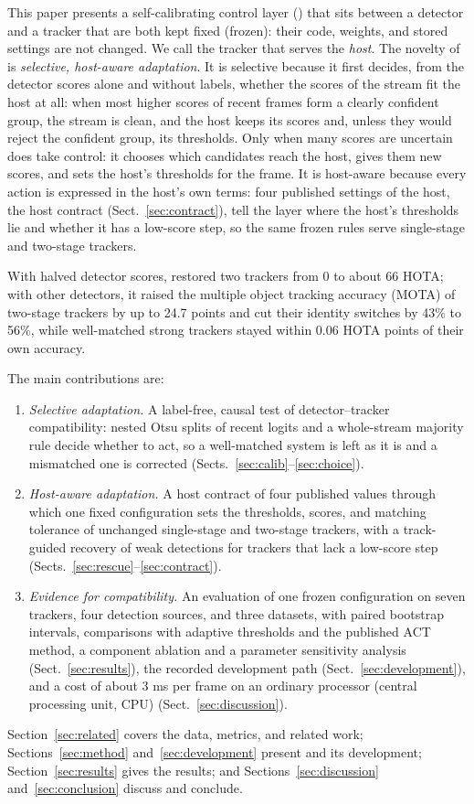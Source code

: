This paper presents a self-calibrating control layer (\scl{}) that sits between a detector and a
tracker that are both kept fixed (frozen): their code, weights, and stored settings are not
changed. We call the tracker that \scl{} serves the \emph{host}. The novelty of \scl{} is
\emph{selective, host-aware adaptation}. It is selective because it first decides, from the
detector scores alone and without labels, whether the scores of the stream fit the host at all:
when most higher scores of recent frames form a clearly confident group, the stream is clean, and
the host keeps its scores and, unless they would reject the confident group, its thresholds. Only
when many scores are uncertain does \scl{} take control: it chooses which candidates reach the
host, gives them new scores, and sets the host's thresholds for the frame. It is host-aware because
every action is expressed in the host's own terms: four published settings of the host, the host
contract (Sect.~\ref{sec:contract}), tell the layer where the host's thresholds lie and whether it
has a low-score step, so the same frozen rules serve single-stage and two-stage trackers.

With halved detector scores, \scl{} restored two trackers from 0 to about 66 HOTA; with other
detectors, it raised the multiple object tracking accuracy (MOTA) of two-stage trackers by up to
24.7 points and cut their identity switches by 43\% to 56\%, while well-matched strong trackers
stayed within 0.06 HOTA points of their own accuracy.

The main contributions are:
\begin{enumerate}
\item \emph{Selective adaptation.} A label-free, causal test of detector--tracker compatibility:
      nested Otsu splits of recent logits and a whole-stream majority rule decide whether to act,
      so a well-matched system is left as it is and a mismatched one is corrected
      (Sects.~\ref{sec:calib}--\ref{sec:choice}).
\item \emph{Host-aware adaptation.} A host contract of four published values through which one
      fixed configuration sets the thresholds, scores, and matching tolerance of unchanged
      single-stage and two-stage trackers, with a track-guided recovery of weak detections for
      trackers that lack a low-score step (Sects.~\ref{sec:rescue}--\ref{sec:contract}).
\item \emph{Evidence for compatibility.} An evaluation of one frozen configuration on seven
      trackers, four detection sources, and three datasets, with paired bootstrap intervals,
      comparisons with adaptive thresholds and the published ACT method, a component ablation and a
      parameter sensitivity analysis (Sect.~\ref{sec:results}), the recorded development path
      (Sect.~\ref{sec:development}), and a cost of about 3 ms per frame on an ordinary processor
      (central processing unit, CPU) (Sect.~\ref{sec:discussion}).
\end{enumerate}

Section~\ref{sec:related} covers the data, metrics, and related work;
Sections~\ref{sec:method} and~\ref{sec:development} present \scl{} and its development;
Section~\ref{sec:results} gives the results; and Sections~\ref{sec:discussion}
and~\ref{sec:conclusion} discuss and conclude.
